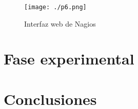 \documentclass[paper=a4, fontsize=12pt]{scrartcl} %
\begin{document}
\begin{figure}[H] %
	\centering
	\label{lsblk}
	\texttt{[image: ./p6.png]}
	\caption{Interfaz web de Nagios} 
\end{figure}

\section{Fase experimental}

\section{Conclusiones}


\end{document}
